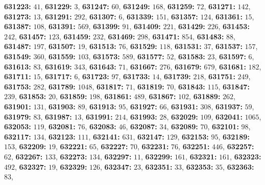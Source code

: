 \textsf{\bfseries 631223:} $41$, \textsf{\bfseries 631229:} $3$, \textsf{\bfseries 631247:} $60$, \textsf{\bfseries 631249:} $168$, \textsf{\bfseries 631259:} $72$, \textsf{\bfseries 631271:} $142$, \textsf{\bfseries 631273:} $13$, \textsf{\bfseries 631291:} $292$, \textsf{\bfseries 631307:} $6$, \textsf{\bfseries 631339:} $151$, \textsf{\bfseries 631357:} $124$, \textsf{\bfseries 631361:} $15$, \textsf{\bfseries 631387:} $108$, \textsf{\bfseries 631391:} $569$, \textsf{\bfseries 631399:} $91$, \textsf{\bfseries 631409:} $221$, \textsf{\bfseries 631429:} $226$, \textsf{\bfseries 631453:} $242$, \textsf{\bfseries 631457:} $123$, \textsf{\bfseries 631459:} $232$, \textsf{\bfseries 631469:} $298$, \textsf{\bfseries 631471:} $854$, \textsf{\bfseries 631483:} $88$, \textsf{\bfseries 631487:} $197$, \textsf{\bfseries 631507:} $19$, \textsf{\bfseries 631513:} $76$, \textsf{\bfseries 631529:} $118$, \textsf{\bfseries 631531:} $37$, \textsf{\bfseries 631537:} $157$, \textsf{\bfseries 631549:} $360$, \textsf{\bfseries 631559:} $103$, \textsf{\bfseries 631573:} $589$, \textsf{\bfseries 631577:} $52$, \textsf{\bfseries 631583:} $23$, \textsf{\bfseries 631597:} $6$, \textsf{\bfseries 631613:} $83$, \textsf{\bfseries 631619:} $343$, \textsf{\bfseries 631643:} $71$, \textsf{\bfseries 631667:} $276$, \textsf{\bfseries 631679:} $679$, \textsf{\bfseries 631681:} $182$, \textsf{\bfseries 631711:} $15$, \textsf{\bfseries 631717:} $6$, \textsf{\bfseries 631723:} $97$, \textsf{\bfseries 631733:} $14$, \textsf{\bfseries 631739:} $218$, \textsf{\bfseries 631751:} $249$, \textsf{\bfseries 631753:} $282$, \textsf{\bfseries 631789:} $1048$, \textsf{\bfseries 631817:} $71$, \textsf{\bfseries 631819:} $70$, \textsf{\bfseries 631843:} $115$, \textsf{\bfseries 631847:} $239$, \textsf{\bfseries 631853:} $20$, \textsf{\bfseries 631859:} $198$, \textsf{\bfseries 631861:} $489$, \textsf{\bfseries 631867:} $102$, \textsf{\bfseries 631889:} $262$, \textsf{\bfseries 631901:} $131$, \textsf{\bfseries 631903:} $89$, \textsf{\bfseries 631913:} $95$, \textsf{\bfseries 631927:} $66$, \textsf{\bfseries 631931:} $308$, \textsf{\bfseries 631937:} $59$, \textsf{\bfseries 631979:} $83$, \textsf{\bfseries 631987:} $13$, \textsf{\bfseries 631991:} $214$, \textsf{\bfseries 631993:} $28$, \textsf{\bfseries 632029:} $109$, \textsf{\bfseries 632041:} $1065$, \textsf{\bfseries 632053:} $119$, \textsf{\bfseries 632081:} $76$, \textsf{\bfseries 632083:} $46$, \textsf{\bfseries 632087:} $34$, \textsf{\bfseries 632089:} $70$, \textsf{\bfseries 632101:} $98$, \textsf{\bfseries 632117:} $134$, \textsf{\bfseries 632123:} $111$, \textsf{\bfseries 632141:} $631$, \textsf{\bfseries 632147:} $129$, \textsf{\bfseries 632153:} $95$, \textsf{\bfseries 632189:} $153$, \textsf{\bfseries 632209:} $19$, \textsf{\bfseries 632221:} $65$, \textsf{\bfseries 632227:} $70$, \textsf{\bfseries 632231:} $76$, \textsf{\bfseries 632251:} $446$, \textsf{\bfseries 632257:} $62$, \textsf{\bfseries 632267:} $133$, \textsf{\bfseries 632273:} $134$, \textsf{\bfseries 632297:} $11$, \textsf{\bfseries 632299:} $161$, \textsf{\bfseries 632321:} $161$, \textsf{\bfseries 632323:} $492$, \textsf{\bfseries 632327:} $19$, \textsf{\bfseries 632329:} $126$, \textsf{\bfseries 632347:} $23$, \textsf{\bfseries 632351:} $33$, \textsf{\bfseries 632353:} $35$, \textsf{\bfseries 632363:} $83$, 
